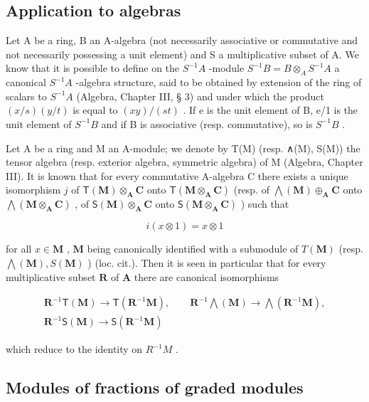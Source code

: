 \subsection{Application to algebras}

Let A be a ring, B an A-algebra (not necessarily associative or commutative and not necessarily possessing a unit element) and S a multiplicative subset of A. We know that it is possible to define on the \(S^{-1}A\) -module \(S^{-1}B = B \otimes_{A} S^{-1}A\) a canonical \(S^{-1}A\) -algebra structure, said to be obtained by extension of the ring of scalars to \(S^{-1}A\) (Algebra, Chapter III, § 3) and under which the product \((x/s)(y/t)\) is equal to \((xy)/(st)\) . If e is the unit element of B, e/1 is the unit element of \(S^{-1}B\) and if B is associative (resp. commutative), so is \(S^{-1}B\) .

Let A be a ring and M an A-module; we denote by T(M) (resp. ∧(M), S(M)) the tensor algebra (resp. exterior algebra, symmetric algebra) of M (Algebra, Chapter III). It is known that for every commutative A-algebra C there exists a unique isomorphism \(j\) of \(\mathsf{T}(\mathbf{M}) \otimes_{\mathbf{A}} \mathbf{C}\) onto \(\mathsf{T}(\mathbf{M} \otimes_{\mathbf{A}} \mathbf{C})\) (resp. of \(\bigwedge (\mathbf{M}) \oplus_{\mathbf{A}} \mathbf{C}\) onto \(\bigwedge (\mathbf{M} \otimes_{\mathbf{A}} \mathbf{C})\) , of \(\mathsf{S}(\mathbf{M}) \otimes_{\mathbf{A}} \mathbf{C}\) onto \(\mathsf{S}(\mathbf{M} \otimes_{\mathbf{A}} \mathbf{C})\) ) such that

\[
i (x \otimes 1) = x \otimes 1
\]

for all \(x \in \mathbf{M}\) , \(\mathbf{M}\) being canonically identified with a submodule of \(T(\mathbf{M})\) (resp. \(\bigwedge (\mathbf{M}), S(\mathbf{M})\) ) (loc. cit.). Then it is seen in particular that for every multiplicative subset \(\mathbf{R}\) of \(\mathbf{A}\) there are canonical isomorphisms

\[
\begin{array}{c} \mathbf {R} ^ {- 1} \mathsf {T} (\mathbf {M}) \to \mathsf {T} (\mathbf {R} ^ {- 1} \mathbf {M}), \qquad \mathbf {R} ^ {- 1} \bigwedge (\mathbf {M}) \to \bigwedge (\mathbf {R} ^ {- 1} \mathbf {M}), \\ \mathbf {R} ^ {- 1} \mathsf {S} (\mathbf {M}) \to \mathsf {S} (\mathbf {R} ^ {- 1} \mathbf {M}) \end{array}
\]

which reduce to the identity on \(R^{-1}M\) .

\subsection{Modules of fractions of graded modules}

